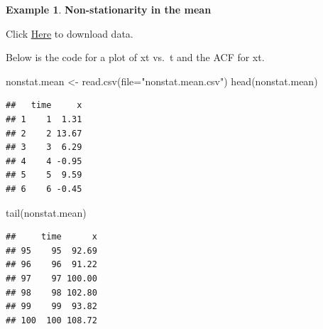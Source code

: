 \documentclass[
]{book}
\newenvironment{Shaded}{\begin{snugshade}}{\end{snugshade}}
\newcommand{\AttributeTok}[1]{\textcolor[rgb]{0.77,0.63,0.00}{#1}}
\newcommand{\DecValTok}[1]{\textcolor[rgb]{0.00,0.00,0.81}{#1}}
\newcommand{\FunctionTok}[1]{\textcolor[rgb]{0.00,0.00,0.00}{#1}}
\newcommand{\NormalTok}[1]{#1}
\newcommand{\OtherTok}[1]{\textcolor[rgb]{0.56,0.35,0.01}{#1}}
\newcommand{\SpecialCharTok}[1]{\textcolor[rgb]{0.00,0.00,0.00}{#1}}
\newcommand{\StringTok}[1]{\textcolor[rgb]{0.31,0.60,0.02}{#1}}
\theoremstyle{definition}
\theoremstyle{definition}
\newtheorem{example}{Example}[chapter]
\theoremstyle{definition}
\theoremstyle{definition}
\theoremstyle{remark}
\begin{document}
\begin{example}

\textbf{Non-stationarity in the mean}

Click \href{http://www.chrisbilder.com/stat878/sections/2/nonstat.mean.csv}{Here} to download data.

Below is the code for a plot of xt vs.~t and the ACF for xt.

\begin{Shaded}
\begin{Highlighting}[]
\NormalTok{nonstat.mean }\OtherTok{\textless{}{-}} \FunctionTok{read.csv}\NormalTok{(}\AttributeTok{file=}\StringTok{"nonstat.mean.csv"}\NormalTok{)}
\FunctionTok{head}\NormalTok{(nonstat.mean)}
\end{Highlighting}
\end{Shaded}

\begin{verbatim}
##   time     x
## 1    1  1.31
## 2    2 13.67
## 3    3  6.29
## 4    4 -0.95
## 5    5  9.59
## 6    6 -0.45
\end{verbatim}

\begin{Shaded}
\begin{Highlighting}[]
\FunctionTok{tail}\NormalTok{(nonstat.mean)}
\end{Highlighting}
\end{Shaded}

\begin{verbatim}
##     time      x
## 95    95  92.69
## 96    96  91.22
## 97    97 100.00
## 98    98 102.80
## 99    99  93.82
## 100  100 108.72
\end{verbatim}

\begin{Shaded}
\end{Shaded}
\end{example}
\end{document}
